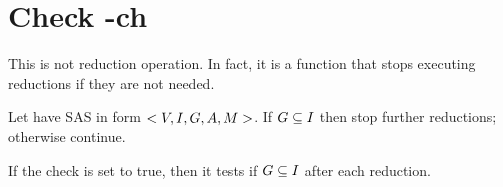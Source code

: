 	\chapter{Check -ch}
	This is not reduction operation. In fact, it is a function that stops executing reductions if they are not needed. 
	
	Let have SAS in form $<V, I, G, A, M{}>$. If $G \subseteq I$ then stop further reductions; otherwise continue.
	
	If the check is set to true, then it tests if $G \subseteq I$ after each reduction.
